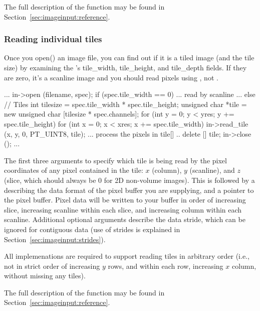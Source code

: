 The full description of the \readscanline function may be found
in Section~\ref{sec:imageinput:reference}.

\subsubsection{Reading individual tiles}

Once you {\kw open()} an image file, you can find out if it is a tiled
image (and the tile size) by examining the \ImageSpec's {\cf
  tile_width}, {\cf tile_height}, and {\cf tile_depth} fields.
If they are zero, it's a scanline image and you should read pixels
using \readscanline, not \readtile.

\begin{code}
        ...
        in->open (filename, spec);
        if (spec.tile_width == 0) {
            ... read by scanline ...
        } else {
            // Tiles
            int tilesize = spec.tile_width * spec.tile_height;
            unsigned char *tile = new unsigned char [tilesize * spec.channels];
            for (int y = 0;  y < yres;  y += spec.tile_height) {
                for (int x = 0;  x < xres;  x += spec.tile_width) {
                    in->read_tile (x, y, 0, PT_UINT8, tile);
                    ... process the pixels in tile[] ..
                }
            }
            delete [] tile;
        }
        in->close ();
        ...
\end{code}

The first three arguments to \readtile specify which tile is
being read by the pixel coordinates of any pixel contained in the
tile: $x$ (column), $y$ (scanline), and $z$ (slice, which should always
be 0 for 2D non-volume images).  This is followed by a \ParamBaseType
describing the data format of the pixel buffer you are supplying, and a
pointer to the pixel buffer.  Pixel data will be written to your buffer
in order of increasing slice, increasing
scanline within each slice, and increasing column within each scanline.
Additional optional arguments describe the data stride, which can be
ignored for contiguous data (use of strides is explained in
Section~\ref{sec:imageinput:strides}).

All \ImageInput implemenations are required to support reading tiles in
arbitrary order (i.e., not in strict order of increasing $y$ rows, and
within each row, increasing $x$ column, without missing any tiles).

The full description of the \readtile function may be found
in Section~\ref{sec:imageinput:reference}.



